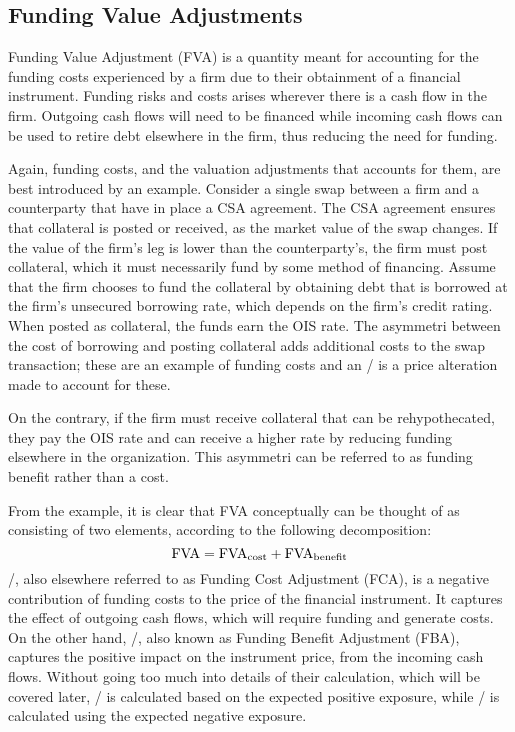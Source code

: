 \documentclass[main.tex]{subfiles}
\begin{document}
    \subsection{Funding Value Adjustments}
        Funding Value Adjustment (FVA) is a quantity meant for accounting for the funding costs 
        experienced by a firm due to their obtainment of a financial instrument.
        Funding risks and costs arises wherever there is a cash flow in the firm. 
        Outgoing cash flows will need to be financed while incoming cash flows
        can be used to retire debt elsewhere in the firm, thus reducing the need for funding.

        Again, funding costs, and the valuation adjustments that accounts for them,
        are best introduced by an example.
        Consider a single swap between a firm and a counterparty that have in place a CSA agreement.
        The CSA agreement ensures that collateral is posted or received,
        as the market value of the swap changes.
        If the value of the firm's leg is lower than the counterparty's,
        the firm must post collateral, which it must necessarily fund by some method of financing.
        Assume that the firm chooses to fund the collateral by obtaining debt
        that is borrowed at the firm's unsecured borrowing rate, which depends on the firm's credit rating.
        When posted as collateral, the funds earn the OIS rate.
        The asymmetri between the cost of borrowing and posting collateral
        adds additional costs to the swap transaction; 
        these are an example of funding costs and an \FVA/ is a price alteration made to account for these.

        On the contrary, if the firm must receive collateral that can be rehypothecated,
        they pay the OIS rate and can receive a higher rate
        by reducing funding elsewhere in the organization.
        This asymmetri can be referred to as funding benefit rather than a cost.
        
        From the example, it is clear that FVA conceptually can be thought of 
        as consisting of two elements, according to the following decomposition:
        \begin{equation}
            \FVA/ = \FCA/ + \FBA/
        \end{equation}
        \FCA/, also elsewhere referred to as Funding Cost Adjustment (FCA), 
        is a negative contribution of funding costs to the price of the financial instrument.
        It captures the effect of outgoing cash flows, which will require funding and generate costs.
        On the other hand, \FBA/, also known as Funding Benefit Adjustment (FBA), 
        captures the positive impact on the instrument price, from the incoming cash flows.
        Without going too much into details of their calculation, which will be covered later,
        \FCA/ is calculated based on the expected positive exposure, 
        while \FBA/ is calculated using the expected negative exposure. 
\end{document}
